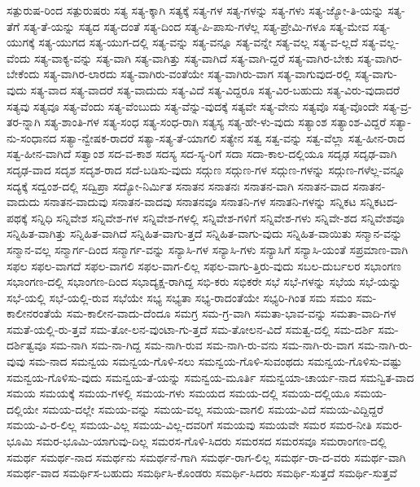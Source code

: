 {ಸತ್ಪುರುಷ-ರಿಂದ
ಸತ್ಪುರುಷರು
ಸತ್ಯ
ಸತ್ಯ-ಕ್ಕಾಗಿ
ಸತ್ಯಕ್ಕೆ
ಸತ್ಯ-ಗಳ
ಸತ್ಯ-ಗಳನ್ನು
ಸತ್ಯ-ಗಳು
ಸತ್ಯ-ಜ್ಯೋ-ತಿ-ಯನ್ನು
ಸತ್ಯ-ತೆಗೆ
ಸತ್ಯ-ತೆ-ಯನ್ನು
ಸತ್ಯದ
ಸತ್ಯ-ದಂತೆ
ಸತ್ಯ-ದಿಂದ
ಸತ್ಯ-ಪಿ-ಪಾಸು-ಗಳೆಲ್ಲ
ಸತ್ಯ-ಪ್ರೇಮಿ-ಗಳೂ
ಸತ್ಯ-ಮೇವ
ಸತ್ಯ-ಯುಗಕ್ಕೆ
ಸತ್ಯ-ಯುಗದ
ಸತ್ಯ-ಯುಗ-ದಲ್ಲಿ
ಸತ್ಯ-ವನ್ನು
ಸತ್ಯ-ವನ್ನೂ
ಸತ್ಯ-ವನ್ನೇ
ಸತ್ಯ-ವಲ್ಲ
ಸತ್ಯ-ವ-ಲ್ಲದೆ
ಸತ್ಯ-ವಲ್ಲ-ವೆಂದು
ಸತ್ಯ-ವಾಕ್ಯ-ವನ್ನು
ಸತ್ಯ-ವಾಗಿ
ಸತ್ಯ-ವಾಗಿತ್ತು
ಸತ್ಯ-ವಾಗಿದೆ
ಸತ್ಯ-ವಾಗಿ-ದ್ದರೆ
ಸತ್ಯ-ವಾಗಿರ-ಬೇಕು
ಸತ್ಯ-ವಾಗಿರ-ಬೇಕೆಂದು
ಸತ್ಯ-ವಾಗಿರ-ಲಾರದು
ಸತ್ಯ-ವಾಗಿರು-ವಂತೆಯೇ
ಸತ್ಯ-ವಾಗಿರು-ವಾಗ
ಸತ್ಯ-ವಾಗುವುದ-ರಲ್ಲಿ
ಸತ್ಯ-ವಾಗು-ವುದು
ಸತ್ಯ-ವಾದ
ಸತ್ಯ-ವಾದರೆ
ಸತ್ಯ-ವಾದುದು
ಸತ್ಯ-ವಿದೆ
ಸತ್ಯ-ವಿದ್ದರೂ
ಸತ್ಯ-ವಿರ-ಬಹುದು
ಸತ್ಯ-ವಿರು-ವುದಾದರೆ
ಸತ್ಯವು
ಸತ್ಯವೂ
ಸತ್ಯ-ವೆಂದು
ಸತ್ಯ-ವೆಂಬುದು
ಸತ್ಯ-ವೆನ್ನು-ವುದಕ್ಕೆ
ಸತ್ಯವೇ
ಸತ್ಯ-ವೇನು
ಸತ್ಯವೊ
ಸತ್ಯ-ವೊಂದೇ
ಸತ್ಯ-ವ್ರ-ತರ-ನ್ನಾಗಿ
ಸತ್ಯ-ಶಾಂತಿ-ಗಳ
ಸತ್ಯ-ಸಂಧ
ಸತ್ಯ-ಸಂಧ-ರಾಗಿ
ಸತ್ಯಸ್ಯ
ಸತ್ಯ-ಹೇ-ಳು-ವುದು
ಸತ್ಯಾಂಶ
ಸತ್ಯಾಂಶ-ವಿದ್ದರೆ
ಸತ್ಯಾ-ನು-ಸಂಧಾನದ
ಸತ್ಯಾ-ನ್ವೇಷಕ-ರಾದರೆ
ಸತ್ಯಾ-ಸತ್ಯ-ತೆ-ಯಾಗಲಿ
ಸತ್ಯೇನ
ಸತ್ವ
ಸತ್ವ-ವನ್ನು
ಸತ್ವ-ವೆಲ್ಲಾ
ಸತ್ವ-ಹೀನ-ರಾದ
ಸತ್ವ-ಹೀನ-ವಾಗಿದೆ
ಸತ್ವಾಂಶ
ಸದ-ವ-ಕಾಶ
ಸದಸ್ಯ
ಸದ-ಸ್ಯ-ರಿಗೆ
ಸದಾ
ಸದಾ-ಕಾಲ-ದಲ್ಲಿಯೂ
ಸದೃಢ
ಸದೃಢ-ವಾಗಿ
ಸದೃಢ-ವಾದ
ಸದೃಶ
ಸದೃಶ-ರಾದ
ಸದೆ-ಬಡಿಸು-ವುದು
ಸದ್ಗುಣ
ಸದ್ಗುಣ-ಗಳ
ಸದ್ಗುಣ-ಗಳನ್ನು
ಸದ್ಗುಣ-ಗಳೆಲ್ಲ-ವನ್ನೂ
ಸದ್ಯಕ್ಕೆ
ಸದ್ವಂಶ-ದಲ್ಲಿ
ಸದ್ವಿಪ್ರಾ
ಸದ್ಯೋ-ನಿರ್ಮಿತ
ಸನಾತನ
ಸನಾತನಃ
ಸನಾತನ-ವಾಗಿ
ಸನಾತನ-ವಾದ
ಸನಾತನ-ವಾದುದು
ಸನಾತನ-ವಾದುವು
ಸನಾತನ-ವಾದವು
ಸನಾತನವೂ
ಸನಾತನಿ-ಗಳ
ಸನಾತನಿ-ಗಳನ್ನು
ಸನ್ನಿಕಟ
ಸನ್ನಿಕಟದ-ಪಥಕ್ಕೆ
ಸನ್ನಿಧಿ
ಸನ್ನಿವೇಶ
ಸನ್ನಿವೇಶ-ಗಳ
ಸನ್ನಿವೇಶ-ಗಳಲ್ಲಿ
ಸನ್ನಿವೇಶ-ಗಳಿಗೆ
ಸನ್ನಿವೇಶ-ಗಳು
ಸನ್ನಿವೇ-ಶದ
ಸನ್ನಿವೇಶವೂ
ಸನ್ನಿಹಿತ-ವಾಗಿತ್ತು
ಸನ್ನಿಹಿತ-ವಾಗಿದೆ
ಸನ್ನಿಹಿತ-ವಾಗು-ತ್ತದೆ
ಸನ್ನಿಹಿತ-ವಾಗು-ವುದು
ಸನ್ನಿಹಿತ-ವಾಯಿತು
ಸನ್ಮಾನ-ವನ್ನು
ಸನ್ಮಾನ-ವಲ್ಲ
ಸನ್ಮಾರ್ಗ-ದಿಂದ
ಸನ್ಮಾರ್ಗ-ವನ್ನು
ಸನ್ಯಾಸಿ-ಗಳ
ಸನ್ಯಾಸಿ-ಗಳು
ಸನ್ಯಾಸಿಗೆ
ಸನ್ಯಾಸಿ-ಯಂತೆ
ಸಪ್ರಮಾಣ-ವಾಗಿ
ಸಫಲ
ಸಫಲ-ವಾಗದೆ
ಸಫಲ-ವಾಗಲಿ
ಸಫಲ-ವಾಗ-ಲಿಲ್ಲ
ಸಫಲ-ವಾಗು-ತ್ತಿರು-ವುದು
ಸಬಲ-ದುರ್ಬಲರ
ಸಭಾಂಗಣ
ಸಭಾಂಗಣ-ದಲ್ಲಿ
ಸಭಾಂಗಣ-ದಿಂದ
ಸಭಾದ್ಯಕ್ಷ-ರಾಗಿದ್ದ
ಸಭಿ-ಕರು
ಸಭಿಕರೇ
ಸಭೆ
ಸಭೆ-ಗಳನ್ನು
ಸಭೆಯ
ಸಭೆ-ಯನ್ನು
ಸಭೆ-ಯಲ್ಲಿ
ಸಭೆ-ಯಲ್ಲಿ-ರುವ
ಸಭೆಯೇ
ಸಭ್ಯ
ಸಭ್ಯತಾ
ಸಭ್ಯ-ರಾದಂತೆಯೇ
ಸಭ್ಯರಿ-ಗಿಂತ
ಸಮ
ಸಮಂ
ಸಮ-ಕಾಲೀನರಂತೆಯೆ
ಸಮ-ಕಾಲೀನ-ವಾದು-ದೆಂದೂ
ಸಮಗ್ರ
ಸಮ-ಗ್ರ-ವಾಗಿ
ಸಮತಾ-ಭಾವ-ವನ್ನು
ಸಮತಾ-ವಾದಿ-ಗಳ
ಸಮತೆ-ಯಲ್ಲಿ-ರು-ತ್ತವೆ
ಸಮ-ತೋ-ಲನ-ವುಂಟಾ-ಗು-ತ್ತದೆ
ಸಮ-ತೋಲನ-ವಿದೆ
ಸಮತ್ವ-ದಲ್ಲಿ
ಸಮ-ದರ್ಶಿ
ಸಮ-ದರ್ಶಿತ್ವವೂ
ಸಮ-ನಾಗಿ
ಸಮ-ನಾ-ಗಿದ್ದ
ಸಮ-ನಾಗಿ-ರುವ
ಸಮ-ನಾಗಿ-ರು-ವನು
ಸಮ-ನಾಗಿ-ರು-ವಾಗ
ಸಮ-ನಾಗಿ-ರು-ವುವು
ಸಮ-ನಾದ
ಸಮನ್ವಯ
ಸಮನ್ವಯ-ಗೊಳಿ-ಸಲು
ಸಮನ್ವಯ-ಗೊಳಿ-ಸುವಂಥದು
ಸಮನ್ವಯ-ಗೊಳಿಸು-ವಷ್ಟು
ಸಮನ್ವಯ-ಗೊಳಿಸು-ವುದು
ಸಮನ್ವಯ-ತೆ-ಯನ್ನು
ಸಮನ್ವಯ-ಮೂರ್ತಿ
ಸಮನ್ವಯಾ-ಚಾರ್ಯ-ನಾದ
ಸಮನ್ವಿತ-ವಾದ
ಸಮಯ
ಸಮಯಕ್ಕೆ
ಸಮಯ-ಗಳಲ್ಲಿ
ಸಮಯ-ಗಳು
ಸಮಯದ
ಸಮಯ-ದಲ್ಲಿ
ಸಮಯ-ದಲ್ಲಿಯೂ
ಸಮಯ-ದಲ್ಲಿಯೇ
ಸಮಯ-ದಲ್ಲೇ
ಸಮಯ-ವನ್ನು
ಸಮಯ-ವಲ್ಲ
ಸಮಯ-ವಾಗಲಿ
ಸಮಯ-ವಿದೆ
ಸಮಯ-ವಿದ್ದಿದ್ದರೆ
ಸಮಯ-ವಿ-ರ-ಲಿಲ್ಲ
ಸಮಯ-ವಿಲ್ಲ
ಸಮಯ-ವಿಲ್ಲ-ದವರಿಗೆ
ಸಮಯವು
ಸಮಯವೇ
ಸಮರ
ಸಮರ-ನೀತಿ
ಸಮರ-ಭೂಮಿ
ಸಮರ-ಭೂಮಿ-ಯಾಗುವು-ದಿಲ್ಲ
ಸಮರಸ-ಗೊಳಿ-ಸಿದರು
ಸಮರಸದ
ಸಮರಸವೂ
ಸಮರಾಂಗಣ-ದಲ್ಲಿ
ಸಮರ್ಥ
ಸಮರ್ಥ-ನಾದ
ಸಮರ್ಥನು
ಸಮರ್ಥನೆ-ಗಾಗಿ
ಸಮರ್ಥ-ರಾಗ-ಲಿಲ್ಲ
ಸಮರ್ಥ-ರಾ-ದ-ವರು
ಸಮರ್ಥ-ವಾಗಿ
ಸಮರ್ಥ-ವಾದ
ಸಮರ್ಥಿಸ-ಬಹುದು
ಸಮರ್ಥಿಸಿ-ಕೊಂಡರು
ಸಮರ್ಥಿ-ಸಿದರು
ಸಮರ್ಥಿ-ಸುತ್ತದೆ
ಸಮರ್ಥಿ-ಸುತ್ತವೆ
}
